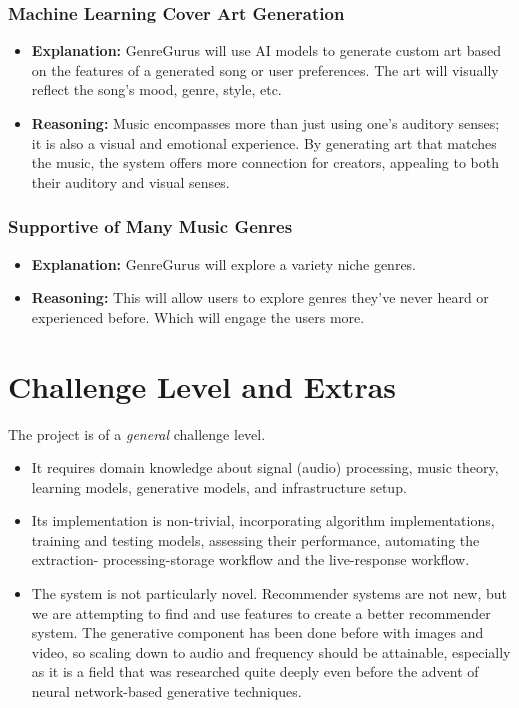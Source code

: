 \documentclass{article}
\begin{document}
\subsubsection*{Machine Learning Cover Art Generation}
\begin{itemize}
    \item \textbf{Explanation:} GenreGurus will use AI models to generate custom art based on the features of a generated song or user preferences. The art will visually reflect the song's mood, genre, style, etc.
    \item \textbf{Reasoning:} Music encompasses more than just using one's auditory senses; it is also a visual and emotional experience. By generating art that matches the music, the system offers more connection for creators, appealing to both their auditory and visual senses.
\end{itemize}

\subsubsection*{Supportive of Many Music Genres}
\begin{itemize}
    \item \textbf{Explanation:} GenreGurus will explore a variety niche genres.
    \item \textbf{Reasoning:} This will allow users to explore genres they’ve never heard or experienced before. Which will engage the users more.
\end{itemize}

\section{Challenge Level and Extras}

The project is of a \emph{general} challenge level.
\begin{itemize}
    \item It requires domain knowledge about signal (audio) processing, music
    theory, learning models, generative models, and infrastructure setup.
    \item Its implementation is non-trivial, incorporating algorithm implementations, 
    training and testing models, assessing their performance, automating the extraction-
    processing-storage workflow and the live-response workflow.
    \item The system is not particularly novel. Recommender systems are not new, but we are 
    attempting to find and use features to create a better recommender system. The generative 
    component has been done before with images and video, so scaling down to audio and frequency 
    should be attainable, especially as it is a field that was researched quite deeply even before 
    the advent of neural network-based generative techniques.
\end{itemize}
\end{document}
